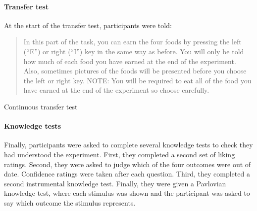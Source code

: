\documentclass[12pt]{article}
\begin{document}
\paragraph{Transfer test}
At the start of the transfer test, participants were told: 

\blockquote{In this part of the task, you can earn the four foods by pressing
the left (``E'') or right (``I'') key in the same way as before. You will only
be told how much of each food you have earned at the end of the experiment.
Also, sometimes pictures of the foods will be presented before you choose the
left or right key. NOTE: You will be required to eat all of the food you have
earned at the end of the experiment so choose carefully.}

Continuous transfer test



\paragraph{Knowledge tests}
Finally, participants were asked to complete several knowledge tests to check
they had understood the experiment. First, they completed a second set of
liking ratings. Second, they were asked to judge which of the four outcomes 
were out of date. Confidence ratings were taken after each question. Third,
they completed a second instrumental knowledge test. Finally, they were given a
Pavlovian knowledge test, where each stimulus was shown and the participant was
asked to say which outcome the stimulus represents. 
\end{document}
